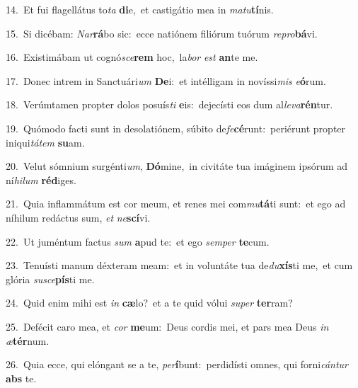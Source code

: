 {\numbfont\textcolor{\numbcolor}{14.}}~Et fui flagellátus to\textit{ta} \textbf{di}\-e,~\star et castigátio mea in \textit{ma}\-\textit{tu}\textbf{tí}nis.\par
{\numbfont\textcolor{\numbcolor}{15.}}~Si dicébam: \textit{Nar}\-\textbf{rá}bo sic:~\star ecce natiónem filiórum tuórum \textit{re}\-\textit{pro}\textbf{bá}vi.\par
{\numbfont\textcolor{\numbcolor}{16.}}~Existimábam ut cognó\-\textit{sce}\-\textbf{rem} hoc,~\star la\textit{bor} \textit{est} \textbf{an}\-te me.\par
{\numbfont\textcolor{\numbcolor}{17.}}~Donec intrem in Sanctuári\textit{um} \textbf{De}\-i:~\star et intélligam in novíssi\textit{mis} \textit{e}\-\textbf{ó}rum.\par
{\numbfont\textcolor{\numbcolor}{18.}}~Verúmtamen propter dolos posuís\textit{ti} \textbf{e}\-is:~\star dejecísti eos dum al\-\textit{le}\-\textit{va}\textbf{rén}tur.\par
{\numbfont\textcolor{\numbcolor}{19.}}~Quómodo facti sunt in desolatiónem, súbito de\-\textit{fe}\-\textbf{cé}runt:~\star periérunt propter iniqui\-\textit{tá}\-\textit{tem} \textbf{su}\-am.\par
{\numbfont\textcolor{\numbcolor}{20.}}~Velut sómnium surgénti\-\textit{um}\-, \textbf{Dó}\-mine,~\star in civitáte tua imáginem ipsórum ad ní\-\textit{hi}\-\textit{lum} \textbf{réd}\-iges.\par
{\numbfont\textcolor{\numbcolor}{21.}}~Quia inflammátum est cor meum, et renes mei com\-\textit{mu}\-\textbf{tá}ti sunt:~\star et ego ad níhilum redáctus sum, \textit{et} \textit{ne}\-\textbf{scí}vi.\par
{\numbfont\textcolor{\numbcolor}{22.}}~Ut juméntum factus \textit{sum} \textbf{a}\-pud te:~\star et ego \textit{sem}\-\textit{per} \textbf{te}\-cum.\par
{\numbfont\textcolor{\numbcolor}{23.}}~Tenuísti manum déxteram meam:~\dagger et in voluntáte tua de\-\textit{du}\-\textbf{xís}ti me,~\star et cum glória \textit{su}\-\textit{sce}\textbf{pís}ti me.\par
{\numbfont\textcolor{\numbcolor}{24.}}~Quid enim mihi est \textit{in} \textbf{cæ}\-lo?~\star et a te quid vólui \textit{su}\-\textit{per} \textbf{ter}\-ram?\par
{\numbfont\textcolor{\numbcolor}{25.}}~Defécit caro mea, et \textit{cor} \textbf{me}\-um:~\star Deus cordis mei, et pars mea Deus \textit{in} \textit{æ}\-\textbf{tér}num.\par
{\numbfont\textcolor{\numbcolor}{26.}}~Quia ecce, qui elóngant se a te, \textit{per}\-\textbf{í}bunt:~\star perdidísti omnes, qui forni\-\textit{cán}\-\textit{tur} \textbf{abs} te.\par
